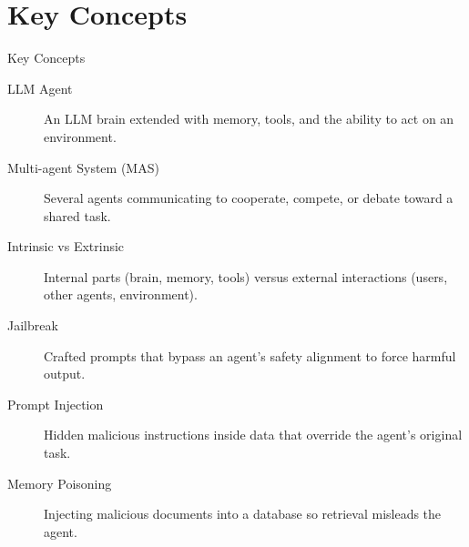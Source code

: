 \documentclass[10pt]{beamer}
\begin{document}
\section{Key Concepts}
\begin{frame}[allowframebreaks]{Key Concepts}
  \begin{description}
    \item[LLM Agent] An LLM brain extended with memory, tools, and the ability to act on an environment.
    \item[Multi-agent System (MAS)] Several agents communicating to cooperate, compete, or debate toward a shared task.
    \item[Intrinsic vs Extrinsic] Internal parts (brain, memory, tools) versus external interactions (users, other agents, environment).
    \item[Jailbreak] Crafted prompts that bypass an agent's safety alignment to force harmful output.
    \item[Prompt Injection] Hidden malicious instructions inside data that override the agent's original task.
    \item[Memory Poisoning] Injecting malicious documents into a database so retrieval misleads the agent.
  \end{description}
\end{frame}
\end{document}
